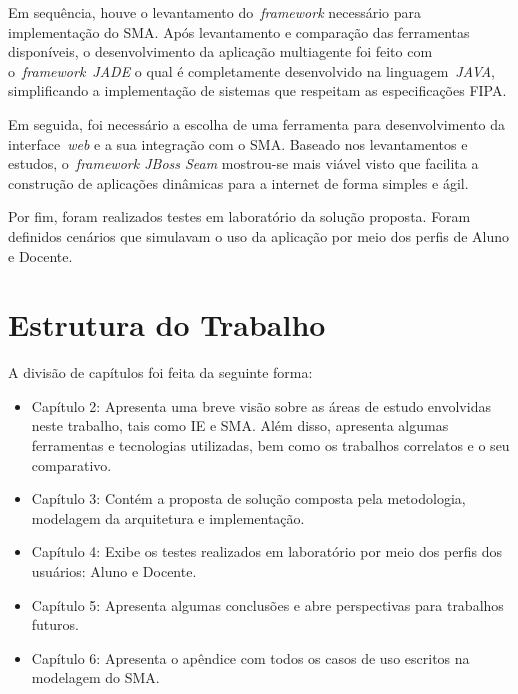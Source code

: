 Em sequência, houve o levantamento do~\emph{framework} necessário para implementação do SMA. Após levantamento e comparação das ferramentas disponíveis, o desenvolvimento da aplicação multiagente foi feito com o~\emph{framework}~\emph{JADE} o qual é completamente desenvolvido na linguagem~\emph{JAVA}, simplificando a implementação de sistemas que respeitam as especificações FIPA. 

Em seguida, foi necessário a escolha de uma ferramenta para desenvolvimento da interface~\emph{web} e a sua integração com o SMA. Baseado nos levantamentos e estudos, o~\emph{framework JBoss Seam} mostrou-se mais viável visto que facilita a construção de aplicações dinâmicas para a internet de forma simples e ágil.

Por fim, foram realizados testes em laboratório da solução proposta. Foram definidos cenários que simulavam o uso da aplicação por meio dos perfis de Aluno e Docente.

\section{Estrutura do Trabalho}
A divisão de capítulos foi feita da seguinte forma:
\begin{itemize}
	\item Capítulo 2: Apresenta uma breve visão sobre as áreas de estudo envolvidas neste trabalho, tais como IE e SMA. Além disso, apresenta algumas ferramentas e tecnologias utilizadas, bem como os trabalhos correlatos e o seu comparativo.
	\item Capítulo 3: Contém a proposta de solução composta pela metodologia, modelagem da arquitetura e implementação.
	\item Capítulo 4: Exibe os testes realizados em laboratório por meio dos perfis dos usuários: Aluno e Docente.
	\item Capítulo 5: Apresenta algumas conclusões e abre perspectivas para trabalhos futuros.
	\item Capítulo 6: Apresenta o apêndice com todos os casos de uso escritos na modelagem do SMA.
\end{itemize}
